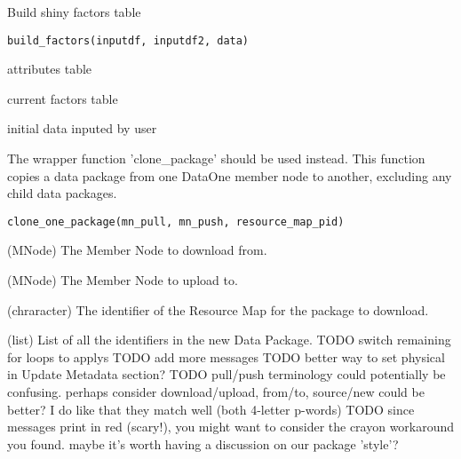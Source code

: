 \documentclass[letterpaper]{book}
\begin{document}
%
\begin{Description}\relax
Build shiny factors table
\end{Description}
%
\begin{Usage}
\begin{verbatim}
build_factors(inputdf, inputdf2, data)
\end{verbatim}
\end{Usage}
%
\begin{Arguments}
\begin{ldescription}
\item[\code{inputdf}] attributes table

\item[\code{inputdf2}] current factors table

\item[\code{data}] initial data inputed by user
\end{ldescription}
\end{Arguments}
%
\begin{Description}\relax
The wrapper function 'clone\_package' should be used instead. This function
copies a data package from one DataOne member node to another, excluding any
child data packages.
\end{Description}
%
\begin{Usage}
\begin{verbatim}
clone_one_package(mn_pull, mn_push, resource_map_pid)
\end{verbatim}
\end{Usage}
%
\begin{Arguments}
\begin{ldescription}
\item[\code{mn\_pull}] (MNode) The Member Node to download from.

\item[\code{mn\_push}] (MNode) The Member Node to upload to.

\item[\code{resource\_map\_pid}] (chraracter) The identifier of the Resource Map for the package to download.
\end{ldescription}
\end{Arguments}
%
\begin{Value}
(list) List of all the identifiers in the new Data Package.
TODO switch remaining for loops to applys
TODO add more messages
TODO better way to set physical in Update Metadata section?
TODO pull/push terminology could potentially be confusing. perhaps consider download/upload, from/to, source/new could be better?  I do like that they match well (both 4-letter p-words)
TODO since messages print in red (scary!), you might want to consider the crayon workaround you found. maybe it's worth having a discussion on our package 'style'?
\end{Value}
\end{document}

